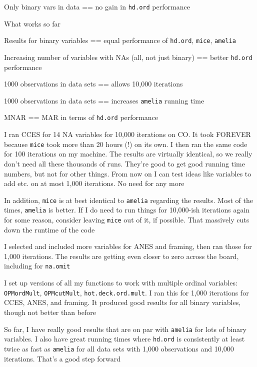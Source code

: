 \documentclass[12pt]{article}
\begin{document}
\begin{coi}
\begin{coi}
				\item Only binary vars in data == no gain in \texttt{hd.ord} performance
			\end{coi}
		\item What works so far
			\begin{coi}
				\item Results for binary variables == equal performance of \texttt{hd.ord}, \texttt{mice}, \texttt{amelia}
				\item Increasing number of variables with NAs (all, not just binary) == better \texttt{hd.ord} performance
				\item 1000 observations in data sets == allows 10,000 iterations
				\item 1000 observations in data sets == increases \texttt{amelia} running time
				\item MNAR == MAR in terms of \texttt{hd.ord} performance
			\end{coi}
		\item I ran CCES for 14 NA variables for 10,000 iterations on CO. It took FOREVER because \texttt{mice} took more than 20 hours (!) on its own. I then ran the same code for 100 iterations on my machine. The results are virtually identical, so we really don't need all these thousands of runs. They're good to get good running time numbers, but not for other things. From now on I can test ideas like variables to add etc. on at most 1,000 iterations. No need for any more
		\item In addition, \texttt{mice} is at best identical to \texttt{amelia} regarding the results. Most of the times, \texttt{amelia} is better. If I do need to run things for 10,000-ish iterations again for some reason, consider leaving \texttt{mice} out of it, if possible. That massively cuts down the runtime of the code
		\item I selected and included more variables for ANES and framing, then ran those for 1,000 iterations. The results are getting even closer to zero across the board, including for \texttt{na.omit}
		\item I set up versions of all my functions to work with multiple ordinal variables: \texttt{OPMordMult}, \texttt{OPMcutMult}, \texttt{hot.deck.ord.mult}. I ran this for 1,000 iterations for CCES, ANES, and framing. It produced good results for all binary variables, though not better than before
		\item So far, I have really good results that are on par with \texttt{amelia} for lots of binary variables. I also have great running times where \texttt{hd.ord} is consistently at least twice as fast as \texttt{amelia} for all data sets with 1,000 observations and 10,000 iterations. That's a good step forward

\end{coi}
\end{document}
